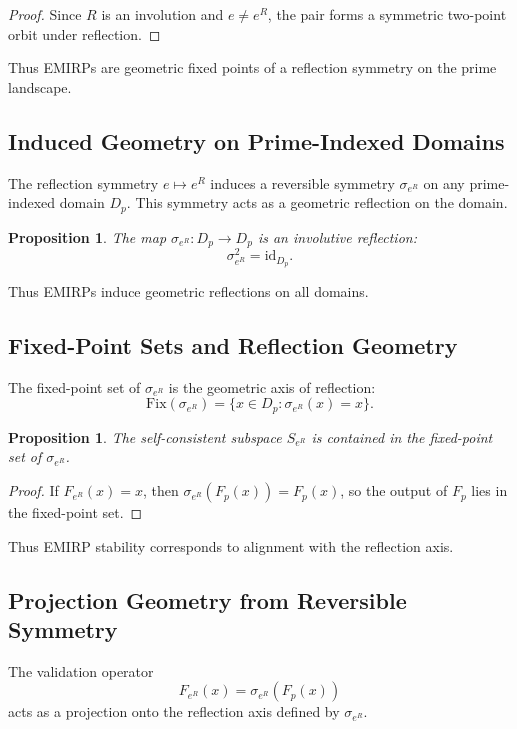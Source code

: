 \documentclass[11pt]{article}
\theoremstyle{definition}
\theoremstyle{plain}
\newtheorem{proposition}[definition]{Proposition}
\theoremstyle{remark}
\begin{document}
\begin{proof}
Since $R$ is an involution and $e \neq e^R$, the pair forms a symmetric
two-point orbit under reflection.
\end{proof}

Thus EMIRPs are geometric fixed points of a reflection symmetry on the
prime landscape.

\subsection{Induced Geometry on Prime-Indexed Domains}

The reflection symmetry $e \mapsto e^R$ induces a reversible symmetry
$\sigma_{e^R}$ on any prime-indexed domain $D_p$. This symmetry acts as
a geometric reflection on the domain.

\begin{proposition}
The map $\sigma_{e^R} : D_p \to D_p$ is an involutive reflection:
\[
\sigma_{e^R}^2 = \mathrm{id}_{D_p}.
\]
\end{proposition}

Thus EMIRPs induce geometric reflections on all domains.

\subsection{Fixed-Point Sets and Reflection Geometry}

The fixed-point set of $\sigma_{e^R}$ is the geometric axis of
reflection:
\[
\mathrm{Fix}(\sigma_{e^R}) = \{x \in D_p : \sigma_{e^R}(x) = x\}.
\]

\begin{proposition}
The self-consistent subspace $S_{e^R}$ is contained in the fixed-point
set of $\sigma_{e^R}$.
\end{proposition}

\begin{proof}
If $F_{e^R}(x) = x$, then $\sigma_{e^R}(F_p(x)) = F_p(x)$, so the output
of $F_p$ lies in the fixed-point set.
\end{proof}

Thus EMIRP stability corresponds to alignment with the reflection axis.

\subsection{Projection Geometry from Reversible Symmetry}

The validation operator
\[
F_{e^R}(x) = \sigma_{e^R}(F_p(x))
\]
acts as a projection onto the reflection axis defined by $\sigma_{e^R}$.
\end{document}

